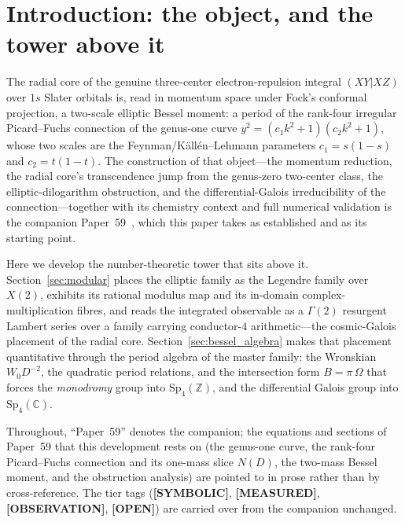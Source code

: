 \documentclass[aps,pra,twocolumn,superscriptaddress,longbibliography]{revtex4-2}
\begin{document}
\maketitle

\section{Introduction: the object, and the tower above it}

The radial core of the genuine three-center electron-repulsion integral $(XY|XZ)$ over $1s$ Slater
orbitals is, read in momentum space under Fock's conformal projection, a
two-scale elliptic Bessel moment: a period of the rank-four irregular
Picard--Fuchs connection of the genus-one curve
$y^{2}=(c_{1}k^{2}+1)(c_{2}k^{2}+1)$, whose two scales are the
Feynman/K\"all\'en--Lehmann parameters $c_{1}=s(1-s)$ and $c_{2}=t(1-t)$.  The
construction of that object---the momentum reduction, the radial core's transcendence jump
from the genus-zero two-center class, the elliptic-dilogarithm obstruction, and
the differential-Galois irreducibility of the connection---together with its
chemistry context and full numerical validation is the companion
Paper~59~\cite{loutey_paper59}, which this paper takes as established and as its
starting point.

Here we develop the number-theoretic tower that sits above it.
Section~\ref{sec:modular} places the elliptic family as the Legendre family over
$X(2)$, exhibits its rational modulus map and its in-domain
complex-multiplication fibres, and reads the integrated observable as a
$\Gamma(2)$ resurgent Lambert series over a family carrying conductor-$4$
arithmetic---the cosmic-Galois placement of the radial core.  Section~\ref{sec:bessel_algebra} makes that placement
quantitative through the period algebra of the master family: the Wronskian
$W_{0}D^{-2}$, the quadratic period relations, and the intersection form
$B=\pi\,\Omega$ that forces the \emph{monodromy} group into
$\mathrm{Sp}_{4}(\mathbb{Z})$, and the differential Galois group into
$\mathrm{Sp}_{4}(\mathbb{C})$.

Throughout, ``Paper~59'' denotes the companion; the equations and sections of
Paper~59 that this development rests on (the genus-one curve, the rank-four
Picard--Fuchs connection and its one-mass slice $N(D)$, the two-mass Bessel
moment, and the obstruction analysis) are pointed to in prose rather than by
cross-reference.  The tier tags (\textbf{[SYMBOLIC]}, \textbf{[MEASURED]},
\textbf{[OBSERVATION]}, \textbf{[OPEN]}) are carried over from the companion
unchanged.
\end{document}
